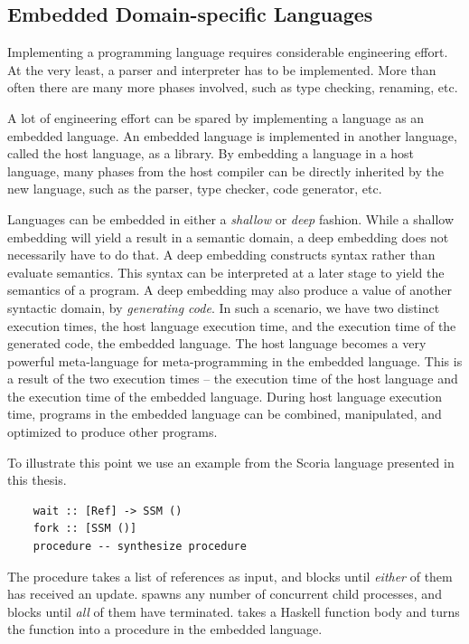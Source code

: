 \subsection{Embedded Domain-specific Languages}

Implementing a programming language requires considerable engineering effort. At the very least, a parser and interpreter
has to be implemented. More than often there are many more phases involved, such as type checking, renaming, etc.

A lot of engineering effort can be spared by implementing a language as an embedded language. An embedded language is
implemented in another language, called the host language, as a library. By embedding a language in
a host language, many phases from the host compiler can be directly inherited by the new language, such as the parser,
type checker, code generator, etc.

Languages can be embedded in either a \textit{shallow} or \textit{deep} fashion.
While a shallow embedding will yield a result in a semantic domain, a deep embedding does not necessarily have to
do that. A deep embedding constructs syntax rather than evaluate semantics. This syntax can be interpreted at a later
stage to yield the semantics of a program. A deep embedding may also produce a value of another syntactic domain, by
\textit{generating code}. In such a scenario, we have two distinct execution times, the host language execution time, and the execution time of the generated
code, the embedded language. The host language becomes a very powerful meta-language for meta-programming in
the embedded language. This is a result of the two execution times -- the execution time of the host language and the
execution time of the embedded language. During host language execution time, programs in the embedded language can be
combined, manipulated, and optimized to produce other programs.

To illustrate this point we use an example from the Scoria language presented in this thesis.

\begin{verbatim}
    wait :: [Ref] -> SSM ()
    fork :: [SSM ()]
    procedure -- synthesize procedure
\end{verbatim}

The  procedure takes a list of references as input, and blocks until \textit{either} of them has received an update.
 spawns any number of concurrent child processes, and blocks until \textit{all} of them have terminated.
 takes a Haskell function body and turns the function into a procedure in the embedded language.

